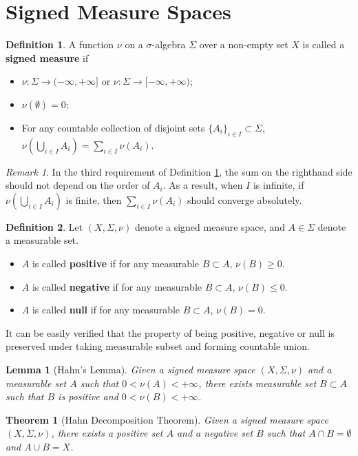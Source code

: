 \documentclass[openany]{book}
\newtheorem{lemma}{Lemma}[chapter]
\newtheorem{theorem}{Theorem}[chapter]
\theoremstyle{definition}
\newtheorem{definition}{Definition}[chapter]
\theoremstyle{remark}
\newtheorem*{remark}{Remark}
\begin{document}
\section{Signed Measure Spaces}
\begin{definition}\label{def:signedMeasure}
    A function $\nu$ on a $\sigma$-algebra $\Sigma$ over a non-empty set $X$ is called a \textbf{signed measure} if
    \begin{itemize}
        \item $\nu:\Sigma\to(-\infty,+\infty]$ or $\nu:\Sigma\to[-\infty,+\infty)$;
        \item $\nu(\emptyset)=0$;
        \item For any countable collection of disjoint sets $\{A_i\}_{i\in I}\subset\Sigma$, $\nu\left(\bigcup_{i\in I}A_i\right)=\sum_{i\in I}\nu(A_i)$.
    \end{itemize}
\end{definition}
\begin{remark}
    In the third requirement of Definition \ref{def:signedMeasure}, the sum on the righthand side should not depend on the order of $A_i$. As a result, when $I$ is infinite, if $\nu\left(\bigcup_{i\in I}A_i\right)$ is finite, then $\sum_{i\in I}\nu(A_i)$ should converge absolutely.
\end{remark}
\begin{definition}
    Let $(X,\Sigma,\nu)$ denote a signed measure space, and $A\in\Sigma$ denote a measurable set.
    \begin{itemize}
        \item $A$ is called \textbf{positive} if for any measurable $B\subset A$, $\nu(B)\ge0$.
        \item $A$ is called \textbf{negative} if for any measurable $B\subset A$, $\nu(B)\le0$.
        \item $A$ is called \textbf{null} if for any measurable $B\subset A$, $\nu(B)=0$.
    \end{itemize}
\end{definition}
It can be easily verified that the property of being positive, negative or null is preserved under taking measurable subset and forming countable union.
\begin{lemma}[Hahn's Lemma]
    Given a signed measure space $(X,\Sigma,\nu)$ and a measurable set $A$ such that $0<\nu(A)<+\infty$, there exists measurable set $B\subset A$ such that $B$ is positive and $0<\nu(B)<+\infty$.
\end{lemma}
\begin{theorem}[Hahn Decomposition Theorem]
    Given a signed measure space $(X,\Sigma,\nu)$, there exists a positive set $A$ and a negative set $B$ such that $A\cap B=\emptyset$ and $A\cup B=X$.
\end{theorem}
\end{document}
